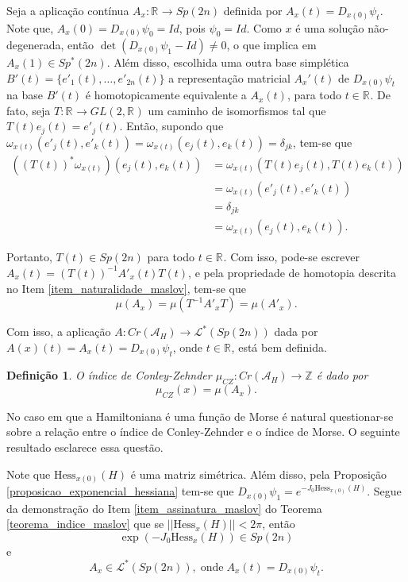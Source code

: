 \documentclass[12pt]{book}
\newtheorem{definicao}[teorema]{Definição}
\newcommand{\caminhosespeciais}[1]{\mathcal{L}^{*}(#1)}
\newcommand{\estruturacomplexa}{J_{0}}
\newcommand{\funcionalH}{\mathcal{A}_{H}}
\newcommand{\generalgroup}[2]{GL(#1, #2)}
\newcommand{\generalgroupreal}[1]{\generalgroup{#1}{\real{}}}
\newcommand{\gruposimpletico}[1]{Sp(#1)}
\newcommand{\gruposimpleticonaodegenerado}[1]{Sp^{#1}(2n)}
\newcommand{\hessianaponto}[2]{\text{Hess}_{#1}(#2)}
\newcommand{\iconley}[1]{\iconleyabrev(#1)}
\newcommand{\iconleyabrev}{\mu_{CZ}}
\newcommand{\inteiros}{\mathbb{Z}}
\newcommand{\norma}[1]{||#1||}
\newcommand{\pontoscriticos}[1]{\textit{Cr}(#1)}
\newcommand{\real}[1]{\mathbb{R}^{#1}}
\newcommand{\reta}{\real{}}
\begin{document}
	Seja a aplicação contínua $A_{x}:\reta \to \gruposimpletico{2n}$ definida por $A_{x}(t) = D_{x(0)}\psi_{t}$. Note que, $A_{x}(0) = D_{x(0)}\psi_{0}=Id$, pois $\psi_{0}=Id$. Como $x$ é uma solução não-degenerada, então $\det(D_{x(0)}\psi_{1}-Id) \neq 0$, o que implica em $A_{x}(1)\in \gruposimpleticonaodegenerado{*}$. Além disso, escolhida uma outra base simplética $B'(t) = \{e'_{1}(t), \dots, e'_{2n}(t)\}$ a representação matricial $A_{x}'(t)$ de $D_{x(0)}\psi_{t}$ na base $B'(t)$ é homotopicamente equivalente a $A_{x}(t)$, para todo $t \in \reta$. De fato, seja $T:\reta \to \generalgroupreal{2}$ um caminho de isomorfismos tal que $T(t)e_{j}(t) = e'_{j}(t)$. Então, supondo que $\omega_{x(t)}(e'_{j}(t), e'_{k}(t))=\omega_{x(t)}(e_{j}(t), e_{k}(t))=\delta_{jk}$, tem-se que
	$$
	\begin{aligned}
			((T(t))^{*}\omega_{x(t)})(e_{j}(t), e_{k}(t))
		&=
		\omega_{x(t)}(T(t)e_{j}(t), T(t)e_{k}(t))
		\\
		&=\omega_{x(t)}(e'_{j}(t), e'_{k}(t)) 
		\\
		&=\delta_{jk}
		\\
		&=\omega_{x(t)}(e_{j}(t), e_{k}(t)). 
	\end{aligned}
	$$
	
	Portanto, $T(t)\in \gruposimpletico{2n}$ para todo $t\in \reta$. Com isso, pode-se escrever $A_{x}(t) = (T(t))^{-1}A'_{x}(t)T(t)$, e pela propriedade de homotopia descrita no Item \ref{item_naturalidade_maslov}, tem-se que 
	$$
	\mu(A_{x}) = \mu(T^{-1}A'_{x}T) = \mu(A'_{x}).
	$$

	Com isso, a aplicação $A: \pontoscriticos{\funcionalH} \to \caminhosespeciais{\gruposimpletico{2n}}$ dada por $A(x)(t) =A_{x}(t)= D_{x(0)}\psi_{t}$, onde $t \in \reta$, está bem definida.
	
	\begin{definicao}
		O índice de Conley-Zehnder $\iconleyabrev:\pontoscriticos{\funcionalH} \to \inteiros$ é dado por 
		$$
		\iconley{x} = \mu(A_{x}).
		$$
	\end{definicao}
	
	No caso em que a Hamiltoniana é uma função de Morse é natural questionar-se sobre a relação entre o índice de Conley-Zehnder e o índice de Morse. O seguinte resultado esclarece essa questão.
	
	Note que $\hessianaponto{x(0)}{H}$ é uma matriz simétrica. Além disso, pela Proposição \ref{proposicao_exponencial_hessiana} tem-se que $D_{x(0)}\psi_{1}= e^{-\estruturacomplexa \hessianaponto{x(0)}{H}}$. Segue da demonstração do Item \ref{item_assinatura_maslov} do Teorema \ref{teorema_indice_maslov} que se $\norma{\hessianaponto{x}{H}}<2\pi$, então 
	$$
	\exp(-\estruturacomplexa \hessianaponto{x}{H}) \in \gruposimpletico{2n}
	$$
	e
	$$ 
	A_{x}\in \caminhosespeciais{\gruposimpletico{2n}},\;\text{onde}\; A_{x}(t) = D_{x(0)}\psi_{t}.
	$$ 
	
\end{document}
